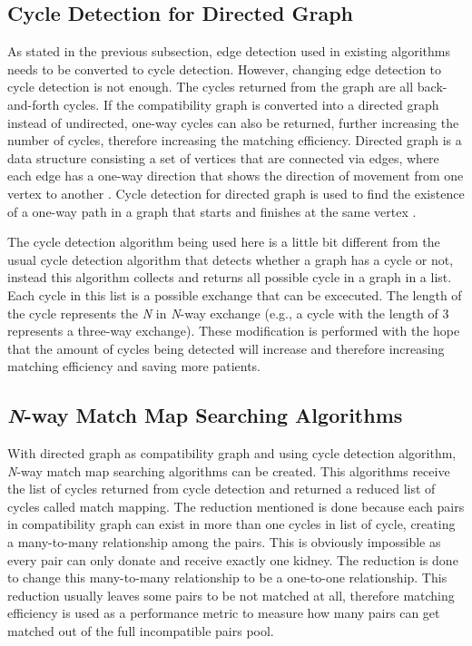 \documentclass[conference]{IEEEtran}
\begin{document}
\subsection{Cycle Detection for Directed Graph}
As stated in the previous subsection, edge detection used in existing algorithms needs to be converted to cycle detection.
However, changing edge detection to cycle detection is not enough. The cycles returned from the graph are all back-and-forth
cycles. If the compatibility graph is converted into a directed graph instead of undirected, one-way cycles can also be
returned, further increasing the number of cycles, therefore increasing the matching efficiency.
Directed graph is a data structure consisting a set of vertices that are connected via edges, where each edge has a one-way
direction that shows the direction of movement from one vertex to another \cite{sedgewick}.
Cycle detection for directed graph is used to find the existence of a one-way path in a graph that starts and finishes
at the same vertex \cite{mehta}.

The cycle detection algorithm being used here is a little bit different from the usual cycle detection algorithm that detects
whether a graph has a cycle or not, instead this algorithm collects and returns all possible cycle in a graph in a list.
Each cycle in this list is a possible exchange that can be excecuted. The length of the cycle represents the \textit{N} in
\textit{N}-way exchange (e.g., a cycle with the length of 3 represents a three-way exchange).
These modification is performed with the hope that the amount of cycles being detected will
increase and therefore increasing matching efficiency and saving more patients.

\subsection{\textit{N}-way Match Map Searching Algorithms}
With directed graph as compatibility graph and using cycle detection algorithm, \textit{N}-way match map searching algorithms
can be created. This algorithms receive the list of cycles returned from cycle detection and returned a reduced list of cycles
called match mapping. The reduction mentioned is done because each pairs in compatibility graph can exist in more than one cycles
in list of cycle, creating a many-to-many relationship among the pairs. This is obviously impossible as every pair can only donate
and receive exactly one kidney. The reduction is done to change this many-to-many relationship to be a one-to-one relationship. This
reduction usually leaves some pairs to be not matched at all, therefore matching efficiency is used as a performance metric to
measure how many pairs can get matched out of the full incompatible pairs pool.  
\end{document}
